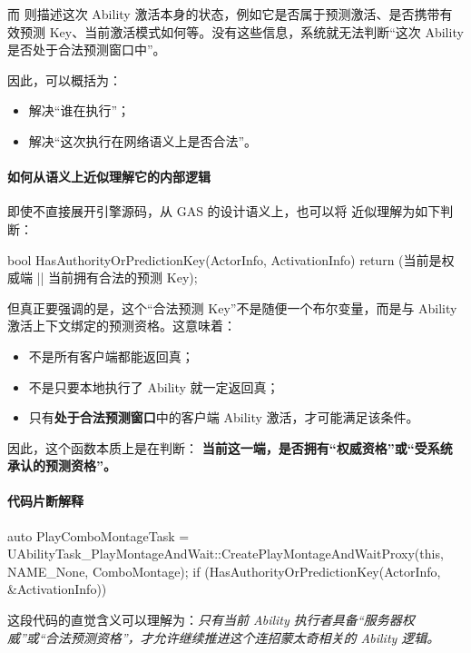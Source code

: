 而  则描述这次 Ability 激活本身的状态，例如它是否属于预测激活、是否携带有效预测 Key、当前激活模式如何等。没有这些信息，系统就无法判断“这次 Ability 是否处于合法预测窗口中”。

因此，可以概括为：

\begin{itemize}
	\item {} 解决“谁在执行”；
	\item {} 解决“这次执行在网络语义上是否合法”。
\end{itemize}

\paragraph{如何从语义上近似理解它的内部逻辑}

即使不直接展开引擎源码，从 GAS 的设计语义上，也可以将  近似理解为如下判断：

\begin{code}
	bool HasAuthorityOrPredictionKey(ActorInfo, ActivationInfo)
	{
		return (当前是权威端 || 当前拥有合法的预测 Key);
	}
\end{code}

但真正要强调的是，这个“合法预测 Key”不是随便一个布尔变量，而是与 Ability 激活上下文绑定的预测资格。这意味着：

\begin{itemize}
	\item 不是所有客户端都能返回真；
	\item 不是只要本地执行了 Ability 就一定返回真；
	\item 只有\textbf{处于合法预测窗口}中的客户端 Ability 激活，才可能满足该条件。
\end{itemize}

因此，这个函数本质上是在判断：
\textbf{	当前这一端，是否拥有“权威资格”或“受系统承认的预测资格”。}

\paragraph{代码片断解释}

\begin{code}
	auto PlayComboMontageTask = UAbilityTask_PlayMontageAndWait::CreatePlayMontageAndWaitProxy(this, NAME_None, ComboMontage);
	if (HasAuthorityOrPredictionKey(ActorInfo, &ActivationInfo))
	{
	}
\end{code}

这段代码的直觉含义可以理解为：\emph{只有当前 Ability 执行者具备“服务器权威”或“合法预测资格”，才允许继续推进这个连招蒙太奇相关的 Ability 逻辑。}

